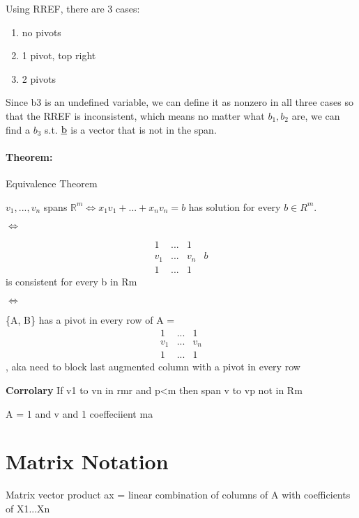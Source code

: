 \documentclass[11pt, notitlepage]{report}
\newcommand{\R}{\mathbb{R}}
\newcommand{\un}[1]{\text{\underline{#1}}}
\newenvironment{theorem}{\paragraph{Theorem:}}{\hfill}
\begin{document}
	Using RREF, there are 3 cases:
	
	\begin{enumerate}
		\item no pivots
		\item 1 pivot, top right
		\item 2 pivots
	\end{enumerate}
	
	Since b3 is an undefined variable, we can define it as nonzero in all three cases so that the RREF is inconsistent, which means no matter what $b_1, b_2$ are, we can find a $b_3$ s.t. $\un{b}$ is a vector that is not in the span. 

\begin{theorem}{Equivalence Theorem}

	$v_1,..., v_n$ spans $\R^m \iff x_1 v_1+...+x_n v_n = b$ has solution for every $b \in R^m$.
	
	$\iff$
	
	\[
	\begin{matrix}{}
	  1&... &1 &  \\
	  v_1&... &v_n & b \\
	  1&... &1 & 
	\end{matrix}
	\]is consistent for every b in Rm
	
	$\iff$
	
	\newpage
	\{A, B\} has a pivot in every row of 
	A =\[
	\begin{matrix}{}
	  1&... &1 \\
	  v_1&... &v_n \\
	  1&... &1
	\end{matrix}
	\], aka need to block last augmented column with a pivot in every row
	
	
	
\end{theorem}

\textbf{Corrolary} If v1 to vn in rmr and p<m then span v to vp not in Rm

A = 1 and v and 1 coeffeciient ma



\section{Matrix Notation}

Matrix vector product ax = linear combination of columns of A with coefficients of X1...Xn
  	
  	
  	
	
\end{document}
